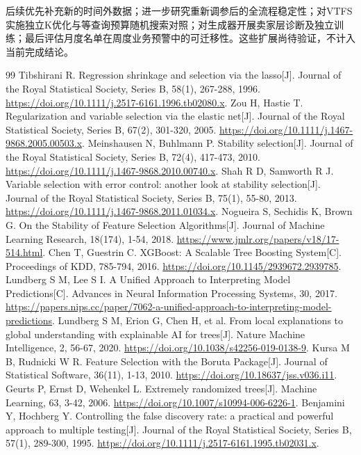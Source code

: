 \documentclass[UTF8,12pt,a4paper]{ctexart}
\begin{document}
后续优先补充新的时间外数据；进一步研究重新调参后的全流程稳定性；对VTFS实施独立K优化与等查询预算随机搜索对照；对生成器开展卖家层诊断及独立训练；最后评估月度名单在周度业务预警中的可迁移性。这些扩展尚待验证，不计入当前完成结论。
\begin{thebibliography}{99}
 Tibshirani R. Regression shrinkage and selection via the lasso[J]. Journal of the Royal Statistical Society, Series B, 58(1), 267-288, 1996. \url{https://doi.org/10.1111/j.2517-6161.1996.tb02080.x}.
 Zou H, Hastie T. Regularization and variable selection via the elastic net[J]. Journal of the Royal Statistical Society, Series B, 67(2), 301-320, 2005. \url{https://doi.org/10.1111/j.1467-9868.2005.00503.x}.
 Meinshausen N, Buhlmann P. Stability selection[J]. Journal of the Royal Statistical Society, Series B, 72(4), 417-473, 2010. \url{https://doi.org/10.1111/j.1467-9868.2010.00740.x}.
 Shah R D, Samworth R J. Variable selection with error control: another look at stability selection[J]. Journal of the Royal Statistical Society, Series B, 75(1), 55-80, 2013. \url{https://doi.org/10.1111/j.1467-9868.2011.01034.x}.
 Nogueira S, Sechidis K, Brown G. On the Stability of Feature Selection Algorithms[J]. Journal of Machine Learning Research, 18(174), 1-54, 2018. \url{https://www.jmlr.org/papers/v18/17-514.html}.
 Chen T, Guestrin C. XGBoost: A Scalable Tree Boosting System[C]. Proceedings of KDD, 785-794, 2016. \url{https://doi.org/10.1145/2939672.2939785}.
 Lundberg S M, Lee S I. A Unified Approach to Interpreting Model Predictions[C]. Advances in Neural Information Processing Systems, 30, 2017. \url{https://papers.nips.cc/paper/7062-a-unified-approach-to-interpreting-model-predictions}.
 Lundberg S M, Erion G, Chen H, et al. From local explanations to global understanding with explainable AI for trees[J]. Nature Machine Intelligence, 2, 56-67, 2020. \url{https://doi.org/10.1038/s42256-019-0138-9}.
 Kursa M B, Rudnicki W R. Feature Selection with the Boruta Package[J]. Journal of Statistical Software, 36(11), 1-13, 2010. \url{https://doi.org/10.18637/jss.v036.i11}.
 Geurts P, Ernst D, Wehenkel L. Extremely randomized trees[J]. Machine Learning, 63, 3-42, 2006. \url{https://doi.org/10.1007/s10994-006-6226-1}.
 Benjamini Y, Hochberg Y. Controlling the false discovery rate: a practical and powerful approach to multiple testing[J]. Journal of the Royal Statistical Society, Series B, 57(1), 289-300, 1995. \url{https://doi.org/10.1111/j.2517-6161.1995.tb02031.x}.

\end{thebibliography}
\end{document}
